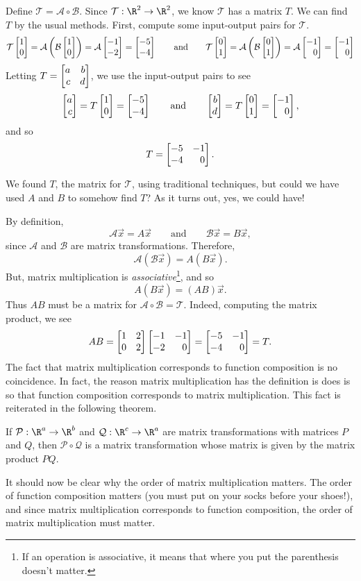 Define $\mathcal T=\mathcal A\circ \mathcal B$. Since $\mathcal T:\R^2\to\R^2$, we know $\mathcal T$ has a matrix $T$. We can
find $T$ by the usual methods. First, compute some input-output pairs for $\mathcal T$.
\[
	\mathcal T\mat{1\\0} = \mathcal A\left( \mathcal B\mat{1\\0}\right) = \mathcal A\mat{-1\\-2}=\mat{-5\\-4}
	\qquad\text{and}\qquad
	\mathcal T\mat{0\\1} = \mathcal A\left( \mathcal B\mat{0\\1}\right) = \mathcal A\mat{-1\\0}=\mat{-1\\0}
\]
Letting $T=\mat{a&b\\c&d}$, we use the input-output pairs to see
\[
	\mat{a\\c}=T\mat{1\\0}=\mat{-5\\-4}\qquad \text{and}\qquad \mat{b\\d}=T\mat{0\\1}=\mat{-1\\0},
\]
and so
\[
	T=\mat{-5&-1\\-4&0}.
\]

We found $T$, the matrix for $\mathcal T$, using traditional techniques, but could we have used $A$ and $B$ to somehow find $T$?
As it turns out, yes, we could have!

By definition,
\[
	\mathcal A\vec x=A\vec x\qquad\text{and}\qquad \mathcal B\vec x=B\vec x,
\]
since $\mathcal A$ and $\mathcal B$ are matrix transformations. Therefore,
\[
	\mathcal A(\mathcal B\vec x) = A(B\vec x).
\]
But, matrix multiplication is \emph{associative}\footnote{ If an operation is associative, it means
that where you put the parenthesis doesn't matter.}, and so
\[
	A(B\vec x)=(AB)\vec x.
\]
Thus $AB$ must be a matrix for $\mathcal A\circ \mathcal B=\mathcal T$. Indeed, computing the matrix product, we see
\[
	AB=\mat{1&2\\0&2}\mat{-1&-1\\-2&0}=\mat{-5&-1\\-4&0}=T.
\]
The fact that matrix multiplication corresponds to function composition is no coincidence. In fact, 
the reason matrix multiplication has the definition is does is so that function composition
corresponds to matrix multiplication. This fact is reiterated in the following theorem.

\begin{theorem}
	If $\mathcal P:\R^a\to\R^b$ and $\mathcal Q:\R^c\to \R^a$ are matrix transformations with matrices 
	$P$ and $Q$, then $\mathcal P\circ \mathcal Q$ is a matrix transformation whose matrix is given
	by the matrix product $PQ$.
\end{theorem}

It should now be clear why the order of matrix multiplication matters. The order of function composition
matters (you must put on your socks before your shoes!), and since matrix multiplication corresponds
to function composition, the order of matrix multiplication must matter.
